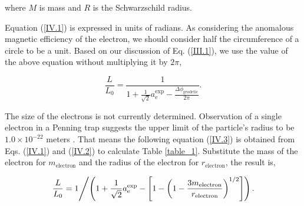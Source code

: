 \documentclass[%
 reprint,
 amsmath,amssymb,
 aps,
]{revtex4-1}
\numberwithin{equation}{section}%
\begin{document}
\noindent where $M$ is mass and $R$ is the Schwarzschild radius.



Equation (\ref{IV.1}) is expressed in units of radians. As considering the anomalous magnetic efficiency of the electron, we should consider half the circumference of a circle to be a unit. Based on our discussion of Eq. (\ref{III.1}), we use the value of the above equation without multiplying it by $2 \pi$,

\begin{equation}
    \frac{L}{L_0} = \frac{1}{1 + \frac{1}{\sqrt{2}}a^{\text{exp}}_{\text{e}} - \frac{\Delta \phi_{\mathrm{geodetic}}}{2 \pi}} .
    \label{IV.2}
\end{equation}


The size of the electrons is not currently determined. Observation of a single electron in a Penning trap suggests the upper limit of the particle's radius to be $1.0 \times 10^{-22}$ meters \cite{Dehmelt}. That means the following equation (\ref{IV.3}) is obtained from Eqs. (\ref{IV.1}) and (\ref{IV.2}) to calculate Table \ref{table_1}.  Substitute the mass of the electron for $m_{\mathrm{electron}}$ and the radius of the electron for $r_{\mathrm{electron}}$, the result is,

\begin{equation}
    \left. %
    \frac{L}{L_0} = 1
    \middle/
    \left( {1 + \frac{1}{\sqrt{2}}a^{\text{exp}}_{\text{e}} - \left[ 1 - \left( 1 - \frac{3 m_{\mathrm{electron}}}{r_{\mathrm{electron}}} \right)^{1/2} \right]} \right).
    \right.
    \label{IV.3}
\end{equation}
\end{document}
